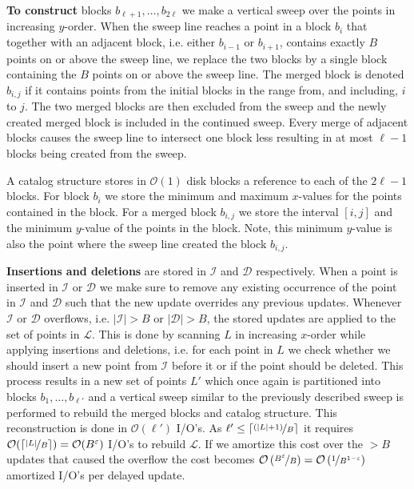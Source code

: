 \documentclass[twoside,11pt,openright]{report}
\def \epsilon {\varepsilon}
\begin{document}
\textbf{To construct} blocks $b_{\ell+1},\dots,b_{2\ell}$ we make a vertical sweep over the points in increasing $y$-order. When the sweep line reaches a point in a block $b_i$ that together with an adjacent block, i.e. either $b_{i-1}$ or $b_{i+1}$, contains exactly $B$ points on or above the sweep line, we replace the two blocks by a single block containing the $B$ points on or above the sweep line.  The merged block is denoted $b_{i,j}$ if it contains points from the initial blocks in the range from, and including, $i$ to $j$. The two merged blocks are then excluded from the sweep and the newly created merged block is included in the continued sweep. Every merge of adjacent blocks causes the sweep line to intersect one block less resulting in at most $\ell-1$ blocks being created from the sweep.

A catalog structure stores in $\mathcal{O}(1)$ disk blocks a reference to each of the $2\ell-1$ blocks. For block $b_i$ we store the minimum and maximum $x$-values for the points contained in the block. For a merged block $b_{i,j}$ we store the interval $\left[ i,j\right]$ and the minimum $y$-value of the points in the block. Note, this minimum $y$-value is also the point where the sweep line created the block $b_{i,j}$.


\textbf{Insertions and deletions} are stored in $\mathcal{I}$ and $\mathcal{D}$ respectively. When a point is inserted in $\mathcal{I}$ or $\mathcal{D}$ we make sure to remove any existing occurrence of the point in $\mathcal{I}$ and $\mathcal{D}$ such that the new update overrides any previous updates. Whenever $\mathcal{I}$ or $\mathcal{D}$ overflows, i.e. $\vert \mathcal{I} \vert > B$ or $\vert \mathcal{D} \vert > B$, the stored updates are applied to the set of points in $\mathcal{L}$. This is done by scanning $L$ in increasing $x$-order while applying insertions and deletions, i.e. for each point in $L$ we check whether we should insert a new point from $\mathcal{I}$ before it or if the point should be deleted. This process results in a new set of points $L'$ which once again is partitioned into blocks $b_1,\dots,b_{\ell'}$ and a vertical sweep similar to the previously described sweep is performed to rebuild the merged blocks and catalog structure.
This reconstruction is done in $\mathcal{O}(\ell')$ I/O's. As $\ell' \leq \lceil \nicefrac{(\vert L \vert + 1)}{B}\rceil$ it requires $\mathcal{O}(\lceil \nicefrac{\vert L \vert}{B}\rceil) = \mathcal{O}(B^\epsilon)$ I/O's to rebuild $\mathcal{L}$. If we amortize this cost over the $>B$ updates that caused the overflow the cost becomes $\mathcal{O}\left(\nicefrac{B^\epsilon}{B}\right) = \mathcal{O}\left(\nicefrac{1}{B^{1-\epsilon}}\right)$ amortized I/O's per delayed update.
\end{document}
